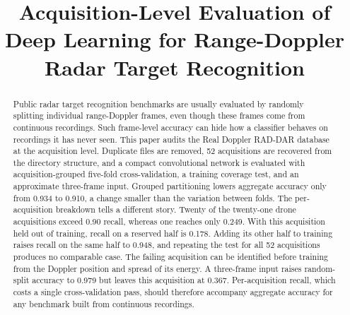 \documentclass[conference]{IEEEtran}
\begin{document}
\title{Acquisition-Level Evaluation of Deep Learning for Range-Doppler Radar Target Recognition}

\newif\ifblind
\blindtrue

\ifblind
  \newcommand{\codeurl}{a repository archived with the submission}
  \author{\IEEEauthorblockN{}\IEEEauthorblockA{}}
\else
  \newcommand{\codeurl}{\url{github.com/falcon-colab/rdrd-acquisition-coverage}}
  \author{\IEEEauthorblockN{Ghulam Mustafa, Ghulam Murtaza, Ali Nawaz, Salman Liaquat, Raja Farrukh Ali}
  \IEEEauthorblockA{\textit{College of Aeronautical Engineering}, \textit{National University of Sciences and Technology}, Islamabad, Pakistan \\
  gmustafa.ms19avecae@student.nust.edu.pk, murtaza.sab2@gmail.com, alinawaz1302@gmail.com, \\salmanliaquat@ieee.org, rfali@cae.nust.edu.pk}
  }
\fi

\maketitle

\begin{abstract}
Public radar target recognition benchmarks are usually evaluated by randomly splitting individual range-Doppler frames, even though these frames come from continuous recordings. Such frame-level accuracy can hide how a classifier behaves on recordings it has never seen. This paper audits the Real Doppler RAD-DAR database at the acquisition level. Duplicate files are removed, 52 acquisitions are recovered from the directory structure, and a compact convolutional network is evaluated with acquisition-grouped five-fold cross-validation, a training coverage test, and an approximate three-frame input. Grouped partitioning lowers aggregate accuracy only from 0.934 to 0.910, a change smaller than the variation between folds. The per-acquisition breakdown tells a different story. Twenty of the twenty-one drone acquisitions exceed 0.90 recall, whereas one reaches only 0.249. With this acquisition held out of training, recall on a reserved half is 0.178. Adding its other half to training raises recall on the same half to 0.948, and repeating the test for all 52 acquisitions produces no comparable case. The failing acquisition can be identified before training from the Doppler position and spread of its energy. A three-frame input raises random-split accuracy to 0.979 but leaves this acquisition at 0.367. Per-acquisition recall, which costs a single cross-validation pass, should therefore accompany aggregate accuracy for any benchmark built from continuous recordings.
\end{abstract}
\end{document}
